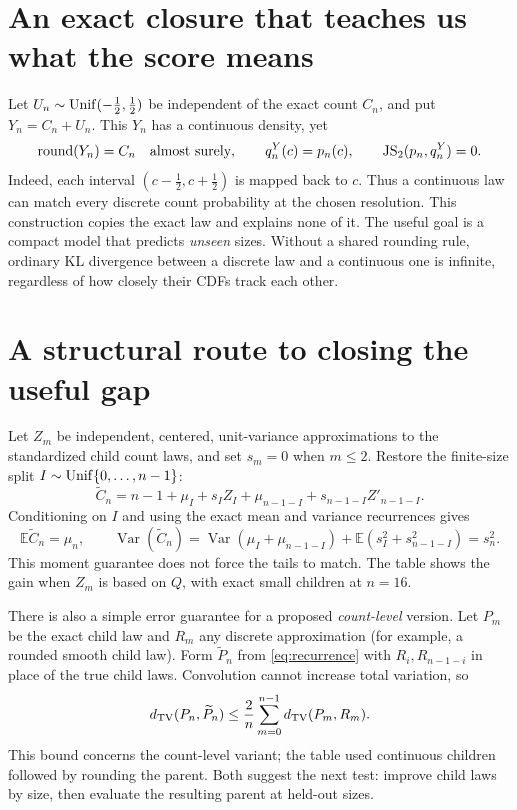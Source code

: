\documentclass[10pt]{article}
\begin{document}
\section*{An exact closure that teaches us what the score means}
Let $U_n\sim{\rm Unif}(-\tfrac12,\tfrac12)$ be independent of the exact count
$C_n$, and put $Y_n=C_n+U_n$. This $Y_n$ has a continuous density, yet
\begin{equation}
 \operatorname{round}(Y_n)=C_n\quad\hbox{almost surely},\qquad
 q^Y_n(c)=p_n(c),\qquad \operatorname{JS}_2(p_n,q^Y_n)=0.
 \label{eq:lift}
\end{equation}
Indeed, each interval $(c-\tfrac12,c+\tfrac12)$ is mapped back to $c$.
Thus a continuous law can match every discrete count probability at the
chosen resolution. This construction copies the exact law and explains none
of it. The useful goal is a compact model that predicts \emph{unseen} sizes.
Without a shared rounding rule, ordinary KL divergence between a discrete
law and a continuous one is infinite, regardless of how closely their CDFs
track each other.

\section*{A structural route to closing the useful gap}
Let $Z_m$ be independent, centered, unit-variance approximations to the
standardized child count laws, and set $s_m=0$ when $m\leq2$. Restore the
finite-size split $I\sim{\rm Unif}\{0,\ldots,n-1\}$:
\begin{equation}
 \widetilde C_n=n-1+\mu_I+s_I Z_I+
 \mu_{n-1-I}+s_{n-1-I}Z'_{n-1-I}.
 \label{eq:splitmodel}
\end{equation}
Conditioning on $I$ and using the exact mean and variance recurrences gives
\begin{equation}
 \mathbb E\widetilde C_n=\mu_n,\qquad
 \operatorname{Var}(\widetilde C_n)
 =\operatorname{Var}(\mu_I+\mu_{n-1-I})
   +\mathbb E(s_I^2+s_{n-1-I}^2)=s_n^2.
 \label{eq:moments}
\end{equation}
This moment guarantee does not force the tails to match. The table shows the
gain when $Z_m$ is based on $Q$, with exact small children at $n=16$.

There is also a simple error guarantee for a proposed \emph{count-level}
version. Let $P_m$ be the exact child law and $R_m$ any discrete approximation
(for example, a rounded smooth child law). Form $\widetilde P_n$ from
\eqref{eq:recurrence} with $R_i,R_{n-1-i}$ in place of the true child laws.
Convolution cannot increase total variation, so
\begin{equation}
 d_{\rm TV}(P_n,\widetilde P_n)
 \leq \frac{2}{n}\sum_{m=0}^{n-1}d_{\rm TV}(P_m,R_m).
 \label{eq:tvbound}
\end{equation}
This bound concerns the count-level variant; the table used continuous
children followed by rounding the parent. Both suggest the next test:
improve child laws by size, then evaluate the resulting parent at held-out
sizes.
\end{document}
